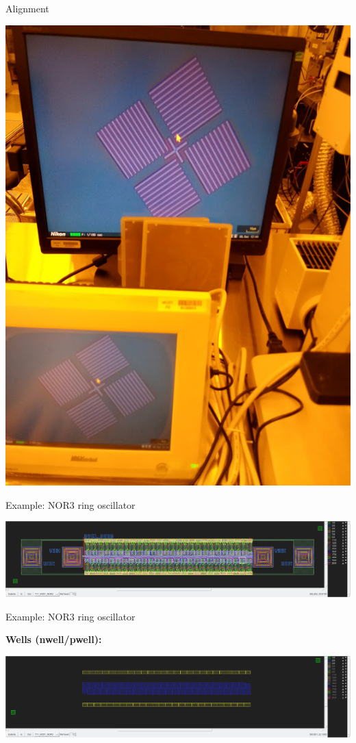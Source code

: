 \documentclass[aspectratio=169]{beamer}
\begin{document}
\begin{frame}{Alignment}
\begin{center}
		\includegraphics[height=0.8\textheight]{images/20181211_161801_Burst01.jpg}
	\end{center}
\end{frame}

\begin{frame}{Example: NOR3 ring oscillator}
	\begin{center}
		\includegraphics[width=\textwidth]{images/Screenshot_20181219_184458.png}
	\end{center}
\end{frame}

\begin{frame}{Example: NOR3 ring oscillator}
	\begin{center}
		\textbf{Wells (nwell/pwell):}

		\includegraphics[width=\textwidth]{images/Screenshot_20181221_124540.png}
	\end{center}
\end{frame}
\end{document}
